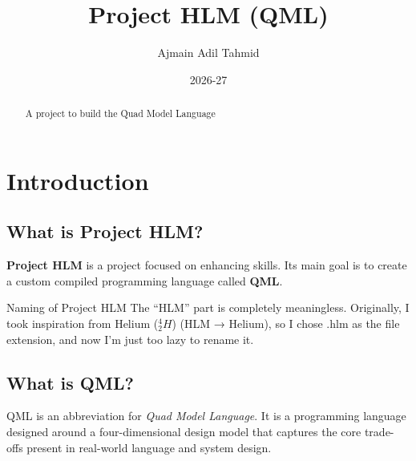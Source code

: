 \documentclass[12pt]{report}
\title{Project HLM (QML)}
\author{Ajmain Adil Tahmid}
\date{2026-27}
\newcommand{\funfact}[2]{\begin{funfactbox}{#1} #2 \end{funfactbox}}
\begin{document}
	
	\maketitle
	
	\begin{abstract}
		\begin{center}
			A project to build the Quad Model Language
		\end{center}
	\end{abstract}
	
	\newpage
	
	\tableofcontents
	
	\newpage
	
	\chapter{Introduction}
	\label{sec:intro}
	\section{What is Project HLM?}
	\textbf{Project HLM} is a project focused on enhancing skills. Its main goal is to create a custom compiled programming language called \textbf{QML}.
	
	\vspace{1.5em}
	
	
	
	\begin{funfactbox}{Naming of Project HLM}
		The “HLM” part is completely meaningless. Originally, I took inspiration from Helium ($^4_2H$)  (HLM → Helium), so I chose .hlm as the file extension, and now I’m just too lazy to rename it.
	\end{funfactbox}
	
	\vspace{0.5em}
	
	\section{What is QML?}
	QML is an abbreviation for \textit{Quad Model Language}. It is a programming language designed around a four-dimensional design model that captures the core trade-offs present in real-world language and system design.
	
	\vspace{1.5em}
	
\end{document}
